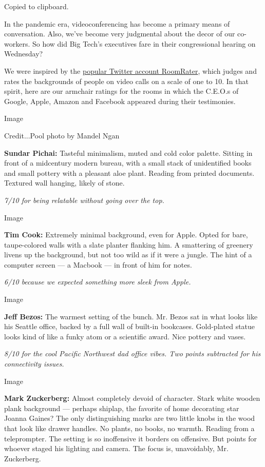 Copied to clipboard.

In the pandemic era, videoconferencing has become a primary means of
conversation. Also, we've become very judgmental about the decor of our
co-workers. So how did Big Tech's executives fare in their congressional
hearing on Wednesday?

We were inspired by the
\href{https://slack-redir.net/link?url=https\%3A\%2F\%2Ftwitter.com\%2Fratemyskyperoom}{popular
Twitter account RoomRater}, which judges and rates the backgrounds of
people on video calls on a scale of one to 10. In that spirit, here are
our armchair ratings for the rooms in which the C.E.O.s of Google,
Apple, Amazon and Facebook appeared during their testimonies.

Image

Credit...Pool photo by Mandel Ngan

\textbf{Sundar Pichai:} Tasteful minimalism, muted and cold color
palette. Sitting in front of a midcentury modern bureau, with a small
stack of unidentified books and small pottery with a pleasant aloe
plant. Reading from printed documents. Textured wall hanging, likely of
stone.

\emph{7/10 for being relatable without going over the top.}

Image

\textbf{Tim Cook:} Extremely minimal background, even for Apple. Opted
for bare, taupe-colored walls with a slate planter flanking him. A
smattering of greenery livens up the background, but not too wild as if
it were a jungle. The hint of a computer screen --- a Macbook --- in
front of him for notes.

\emph{6/10 because we expected something more sleek from Apple.}

Image

\textbf{Jeff Bezos:} The warmest setting of the bunch. Mr. Bezos sat in
what looks like his Seattle office, backed by a full wall of built-in
bookcases. Gold-plated statue looks kind of like a funky atom or a
scientific award. Nice pottery and vases.

\emph{8/10 for the cool Pacific Northwest dad office vibes. Two points
subtracted for his connectivity issues.}

Image

\textbf{Mark Zuckerberg:} Almost completely devoid of character. Stark
white wooden plank background --- perhaps shiplap, the favorite of home
decorating star Joanna Gaines? The only distinguishing marks are two
little knobs in the wood that look like drawer handles. No plants, no
books, no warmth. Reading from a teleprompter. The setting is so
inoffensive it borders on offensive. But points for whoever staged his
lighting and camera. The focus is, unavoidably, Mr. Zuckerberg.

